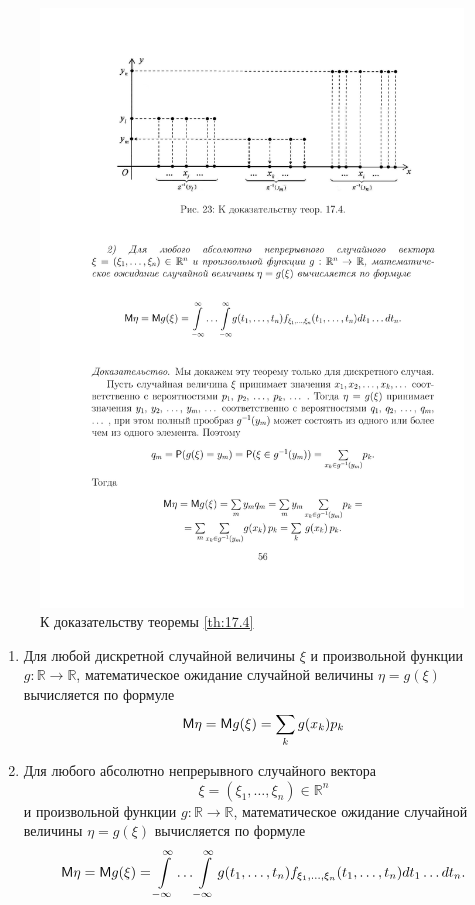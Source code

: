 \begin{figure}[H]
	\centering
	\includegraphics[]{pic/pic23}
	\caption{К доказательству теоремы \ref{th:17.4}}
	\label{fig23}
\end{figure}

\begin{theorem}\-
\label{th:17.4}
\begin{enumerate}
	\item Для любой дискретной случайной величины $\xi$ и произвольной функции $g : \mathbb{R} \to \mathbb{R}$, математическое ожидание случайной величины $\eta = g(\xi)$ вычисляется по формуле
		\begin{equation*}
			\mathsf{M}\eta=\mathsf{M} g(\xi)=\sum_k g(x_k)p_k
		\end{equation*}
	\item Для любого абсолютно непрерывного случайного вектора
	$$\xi = (\xi_1, \ldots, \xi_n) \in \mathbb{R}^n$$ и произвольной функции 
	$g : \mathbb{R} \to \mathbb{R}$, математическое ожидание случайной величины 
	$\eta = g(\xi)$ вычисляется по формуле
		\begin{equation*}
			\mathsf{M}\eta=\mathsf{M} g(\xi)=\int\limits_{-\infty}^{\infty}\ldots
			\int\limits_{-\infty}^{\infty}g(t_1,\ldots,t_n)f_{\xi_1,\ldots,\xi_n}(t_1,\ldots,t_n)dt_1\ldots dt_n.
		\end{equation*}
\end{enumerate}

\end{theorem}

